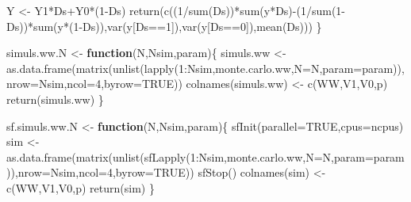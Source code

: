 \documentclass[
]{book}
\newenvironment{Shaded}{\begin{snugshade}}{\end{snugshade}}
\newcommand{\AttributeTok}[1]{\textcolor[rgb]{0.77,0.63,0.00}{#1}}
\newcommand{\ConstantTok}[1]{\textcolor[rgb]{0.00,0.00,0.00}{#1}}
\newcommand{\ControlFlowTok}[1]{\textcolor[rgb]{0.13,0.29,0.53}{\textbf{#1}}}
\newcommand{\DecValTok}[1]{\textcolor[rgb]{0.00,0.00,0.81}{#1}}
\newcommand{\FunctionTok}[1]{\textcolor[rgb]{0.00,0.00,0.00}{#1}}
\newcommand{\NormalTok}[1]{#1}
\newcommand{\OtherTok}[1]{\textcolor[rgb]{0.56,0.35,0.01}{#1}}
\newcommand{\SpecialCharTok}[1]{\textcolor[rgb]{0.00,0.00,0.00}{#1}}
\newcommand{\StringTok}[1]{\textcolor[rgb]{0.31,0.60,0.02}{#1}}
\theoremstyle{definition}
\theoremstyle{definition}
\theoremstyle{definition}
\theoremstyle{definition}
\theoremstyle{remark}
\begin{document}
\begin{Shaded}
\begin{Highlighting}[]
\NormalTok{  Y }\OtherTok{\textless{}{-}}\NormalTok{ Y1}\SpecialCharTok{*}\NormalTok{Ds}\SpecialCharTok{+}\NormalTok{Y0}\SpecialCharTok{*}\NormalTok{(}\DecValTok{1}\SpecialCharTok{{-}}\NormalTok{Ds)}
  \FunctionTok{return}\NormalTok{(}\FunctionTok{c}\NormalTok{((}\DecValTok{1}\SpecialCharTok{/}\FunctionTok{sum}\NormalTok{(Ds))}\SpecialCharTok{*}\FunctionTok{sum}\NormalTok{(y}\SpecialCharTok{*}\NormalTok{Ds)}\SpecialCharTok{{-}}\NormalTok{(}\DecValTok{1}\SpecialCharTok{/}\FunctionTok{sum}\NormalTok{(}\DecValTok{1}\SpecialCharTok{{-}}\NormalTok{Ds))}\SpecialCharTok{*}\FunctionTok{sum}\NormalTok{(y}\SpecialCharTok{*}\NormalTok{(}\DecValTok{1}\SpecialCharTok{{-}}\NormalTok{Ds)),}\FunctionTok{var}\NormalTok{(y[Ds}\SpecialCharTok{==}\DecValTok{1}\NormalTok{]),}\FunctionTok{var}\NormalTok{(y[Ds}\SpecialCharTok{==}\DecValTok{0}\NormalTok{]),}\FunctionTok{mean}\NormalTok{(Ds)))}
\NormalTok{\}}

\NormalTok{simuls.ww.N }\OtherTok{\textless{}{-}} \ControlFlowTok{function}\NormalTok{(N,Nsim,param)\{}
\NormalTok{  simuls.ww }\OtherTok{\textless{}{-}} \FunctionTok{as.data.frame}\NormalTok{(}\FunctionTok{matrix}\NormalTok{(}\FunctionTok{unlist}\NormalTok{(}\FunctionTok{lapply}\NormalTok{(}\DecValTok{1}\SpecialCharTok{:}\NormalTok{Nsim,monte.carlo.ww,}\AttributeTok{N=}\NormalTok{N,}\AttributeTok{param=}\NormalTok{param)),}\AttributeTok{nrow=}\NormalTok{Nsim,}\AttributeTok{ncol=}\DecValTok{4}\NormalTok{,}\AttributeTok{byrow=}\ConstantTok{TRUE}\NormalTok{))}
  \FunctionTok{colnames}\NormalTok{(simuls.ww) }\OtherTok{\textless{}{-}} \FunctionTok{c}\NormalTok{(}\StringTok{\textquotesingle{}WW\textquotesingle{}}\NormalTok{,}\StringTok{\textquotesingle{}V1\textquotesingle{}}\NormalTok{,}\StringTok{\textquotesingle{}V0\textquotesingle{}}\NormalTok{,}\StringTok{\textquotesingle{}p\textquotesingle{}}\NormalTok{)}
  \FunctionTok{return}\NormalTok{(simuls.ww)}
\NormalTok{\}}

\NormalTok{sf.simuls.ww.N }\OtherTok{\textless{}{-}} \ControlFlowTok{function}\NormalTok{(N,Nsim,param)\{}
  \FunctionTok{sfInit}\NormalTok{(}\AttributeTok{parallel=}\ConstantTok{TRUE}\NormalTok{,}\AttributeTok{cpus=}\NormalTok{ncpus)}
\NormalTok{  sim }\OtherTok{\textless{}{-}} \FunctionTok{as.data.frame}\NormalTok{(}\FunctionTok{matrix}\NormalTok{(}\FunctionTok{unlist}\NormalTok{(}\FunctionTok{sfLapply}\NormalTok{(}\DecValTok{1}\SpecialCharTok{:}\NormalTok{Nsim,monte.carlo.ww,}\AttributeTok{N=}\NormalTok{N,}\AttributeTok{param=}\NormalTok{param)),}\AttributeTok{nrow=}\NormalTok{Nsim,}\AttributeTok{ncol=}\DecValTok{4}\NormalTok{,}\AttributeTok{byrow=}\ConstantTok{TRUE}\NormalTok{))}
  \FunctionTok{sfStop}\NormalTok{()}
  \FunctionTok{colnames}\NormalTok{(sim) }\OtherTok{\textless{}{-}} \FunctionTok{c}\NormalTok{(}\StringTok{\textquotesingle{}WW\textquotesingle{}}\NormalTok{,}\StringTok{\textquotesingle{}V1\textquotesingle{}}\NormalTok{,}\StringTok{\textquotesingle{}V0\textquotesingle{}}\NormalTok{,}\StringTok{\textquotesingle{}p\textquotesingle{}}\NormalTok{)}
  \FunctionTok{return}\NormalTok{(sim)}
\NormalTok{\}}


\end{Highlighting}
\end{Shaded}
\end{document}
